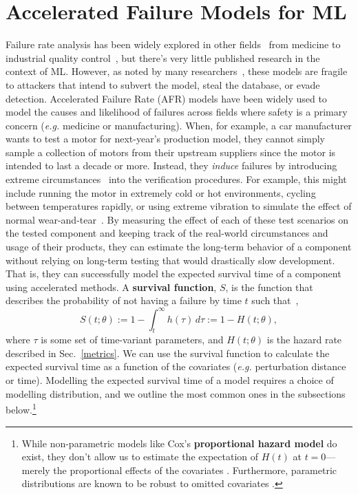\label{afr_models}
\section{Accelerated Failure Models for ML}
Failure rate analysis has been widely explored in other fields~\citep{aft_models} from medicine to industrial quality control~\citep{}, but there's very little published research in the context of ML. However, as noted by many researchers~\citep{madry2017towards, carlini_towards_2017, croce_reliable_2020, meyers}, these models are fragile to attackers that intend to subvert the model, steal the database, or evade detection.  Accelerated Failure Rate (AFR) models have been widely used to model the causes and likelihood of failures across fields where safety is a primary concern (\textit{e.g.} medicine or manufacturing). When, for example, a car manufacturer wants to test a motor for next-year's production model, they cannot simply sample a collection of motors from their upstream suppliers since the motor is intended to last a decade or more. Instead, they \textit{induce} failures by introducing extreme circumstances~\citep{liu2013development,lawless1995methods} into the verification procedures. For example, this might include running the motor in extremely cold or hot environments, cycling between temperatures rapidly, or using extreme vibration to simulate the effect of normal wear-and-tear~\citep{meeker1998accelerated}. By measuring the effect of each of these test scenarios on the tested component and keeping track of the real-world circumstances and usage of their products, they can estimate the long-term behavior of a component without relying on long-term testing that would drastically slow development. That is, they can successfully model the expected survival time of a component using accelerated methods. A \textbf{survival function}, $S$, is the function that describes the probability of not having a failure by time $t$ such that~\cite{},
\[
    S(t; \theta):= 1- \int_t^{\infty} h(\tau) \,d\tau := 1 - H(t; \theta),
\]
where $\tau$ is some set of time-variant parameters, and $H(t; \theta)$ is the hazard rate described in Sec.~\ref{metrics}. We can use the survival function to calculate the expected survival time as a function of the covariates (\textit{e.g.} perturbation distance or time). Modelling the expected survival time of a model requires a choice of modelling distribution, and we outline the most common ones in the subsections below.\footnote{While non-parametric models like Cox's \textbf{proportional hazard model} do exist, they don't allow us to estimate the expectation of $H(t)$ at $t=0$---merely the proportional effects of the covariates \citep{aft_models}. Furthermore, parametric distributions are known to be robust to omitted covariates \citep{lambert2004parametric}.} 


